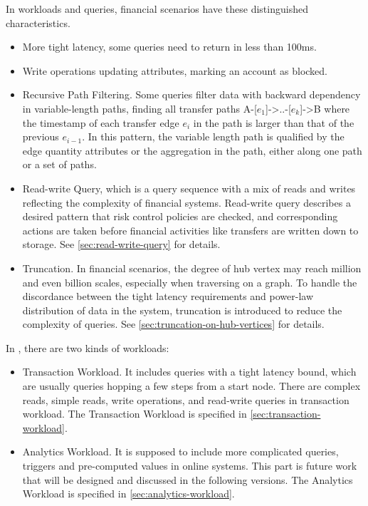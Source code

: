 In workloads and queries, financial scenarios have these distinguished characteristics.
\begin{itemize}
      \item More tight latency, \eg some queries need to return in less than 100ms.
      \item Write operations updating attributes, \eg marking an account as blocked.
      \item Recursive Path Filtering. Some queries filter data with backward dependency
            in variable-length paths, \eg finding all transfer paths A-[${e_1}$]->..-[${e_k}$]->B
            where the timestamp of each transfer edge ${e_i}$ in the path is larger than that of
            the previous ${e_{i-1}}$. In this pattern, the variable length path is qualified by
            the edge quantity attributes or the aggregation in the path, either along one path
            or a set of paths.
      \item Read-write Query, which is a query sequence with a mix of reads and writes reflecting the
            complexity of financial systems. Read-write query describes a desired pattern that risk control
            policies are checked, and corresponding actions are taken before financial activities like
            transfers are written down to storage. See \autoref{sec:read-write-query} for details.
      \item Truncation. In financial scenarios, the degree of hub vertex may reach million and even
            billion scales, especially when traversing on a graph. To handle the discordance between the tight
            latency requirements and power-law distribution of data in the system, truncation is introduced
            to reduce the complexity of queries. See \autoref{sec:truncation-on-hub-vertices} for details.
\end{itemize}

In \ldbcfinbench, there are two kinds of workloads:
\begin{itemize}
      \item Transaction Workload. It includes queries with a tight latency bound, which are usually
            queries hopping a few steps from a start node. There are complex reads, simple reads, write
            operations, and read-write queries in transaction workload. The Transaction Workload is specified
            in \autoref{sec:transaction-workload}.
      \item Analytics Workload. It is supposed to include more complicated queries, \eg triggers and pre-computed
            values in online systems. This part is future work that will be designed and discussed in the
            following versions. The Analytics Workload is specified in \autoref{sec:analytics-workload}.
\end{itemize}


